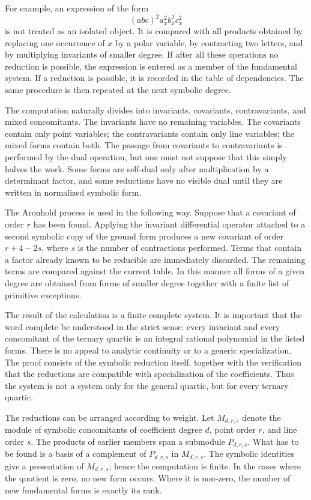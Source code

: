\documentclass[11pt]{article}
\begin{document}
For example, an expression of the form \[   (abc)^2 a_x^2 b_x^2 c_x^2 \] is not treated as an
isolated object. It is compared with all products obtained by replacing one occurrence of \(x\) by a
polar variable, by contracting two letters, and by multiplying invariants of smaller degree. If
after all these operations no reduction is possible, the expression is entered as a member of the
fundamental system. If a reduction is possible, it is recorded in the table of dependencies. The
same procedure is then repeated at the next symbolic degree.


The computation naturally divides into invariants, covariants, contravariants, and mixed
concomitants. The invariants have no remaining variables. The covariants contain only point
variables; the contravariants contain only line variables; the mixed forms contain both. The passage
from covariants to contravariants is performed by the dual operation, but one must not suppose that
this simply halves the work. Some forms are self-dual only after multiplication by a determinant
factor, and some reductions have no visible dual until they are written in normalized symbolic form.


The Aronhold process is used in the following way. Suppose that a covariant of order \(r\) has been
found. Applying the invariant differential operator attached to a second symbolic copy of the ground
form produces a new covariant of order \(r+4-2s\), where \(s\) is the number of contractions
performed. Terms that contain a factor already known to be reducible are immediately discarded. The
remaining terms are compared against the current table. In this manner all forms of a given degree
are obtained from forms of smaller degree together with a finite list of primitive exceptions.


The result of the calculation is a finite complete system. It is important that the word complete be
understood in the strict sense: every invariant and every concomitant of the ternary quartic is an
integral rational polynomial in the listed forms. There is no appeal to analytic continuity or to a
generic specialization. The proof consists of the symbolic reduction itself, together with the
verification that the reductions are compatible with specialization of the coefficients. Thus the
system is not a system only for the general quartic, but for every ternary quartic.


The reductions can be arranged according to weight. Let \(M_{d,r,s}\) denote the module of symbolic
concomitants of coefficient degree \(d\), point order \(r\), and line order \(s\). The products of
earlier members span a submodule \(P_{d,r,s}\). What has to be found is a basis of a complement of
\(P_{d,r,s}\) in \(M_{d,r,s}\). The symbolic identities give a presentation of \(M_{d,r,s}\); hence
the computation is finite. In the cases where the quotient is zero, no new form occurs. Where it is
non-zero, the number of new fundamental forms is exactly its rank.
\end{document}
